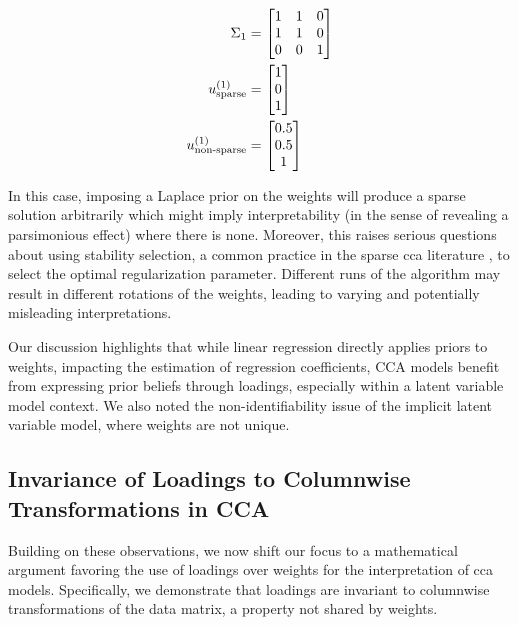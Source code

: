 \begin{align}
    \Sigma_{1} &= \begin{bmatrix}
                         1 & 1 & 0 \\
                         1 & 1 & 0 \\
                         0 & 0 & 1
    \end{bmatrix} \\
    u^{(1)}_\text{sparse} &= \begin{bmatrix}
                                  1 \\
                                  0 \\
                                  1
    \end{bmatrix} \\
    u^{(1)}_\text{non-sparse} &= \begin{bmatrix}
                                      0.5 \\
                                      0.5 \\
                                      1
    \end{bmatrix}
\end{align}

In this case, imposing a Laplace prior on the weights will produce a sparse solution arbitrarily which might imply interpretability (in the sense of revealing a parsimonious effect) where there is none.
Moreover, this raises serious questions about using stability selection, a common practice in the sparse \acrshort{cca} literature \citep{mihalik2020multiple, deng2021sparse}, to select the optimal regularization parameter.
Different runs of the algorithm may result in different rotations of the weights, leading to varying and potentially misleading interpretations.

Our discussion highlights that while linear regression directly applies priors to weights, impacting the estimation of regression coefficients, CCA models benefit from expressing prior beliefs through loadings, especially within a latent variable model context.
We also noted the non-identifiability issue of the implicit latent variable model, where weights are not unique.

\subsection{Invariance of Loadings to Columnwise Transformations in CCA}

Building on these observations, we now shift our focus to a mathematical argument favoring the use of \gls{loadings} over weights for the interpretation of \acrshort{cca} models.
Specifically, we demonstrate that \gls{loadings} are invariant to columnwise transformations of the data matrix, a property not shared by weights.

